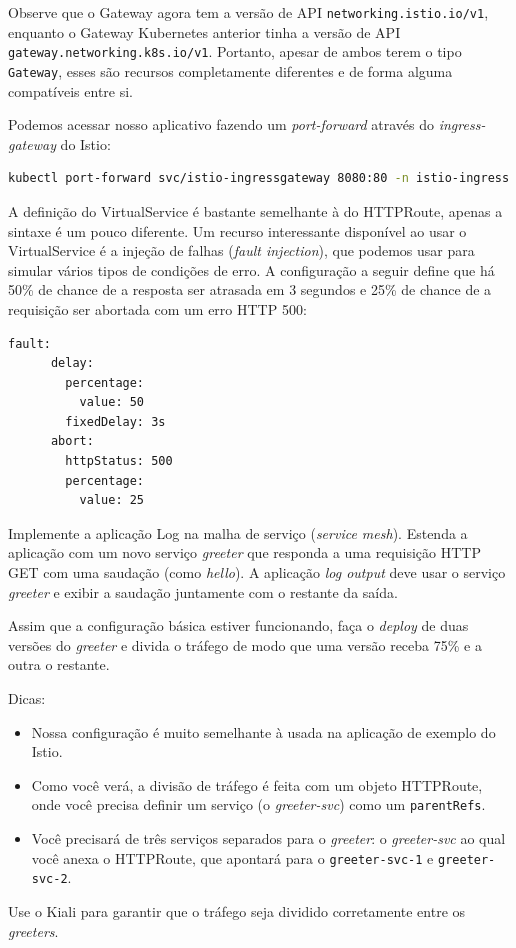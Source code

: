 \documentclass[11pt,a4paper]{article}
\begin{document}
Observe que o Gateway agora tem a versão de API \texttt{networking.istio.io/v1}, enquanto o Gateway Kubernetes anterior tinha a versão de API \texttt{gateway.networking.k8s.io/v1}. Portanto, apesar de ambos terem o tipo \texttt{Gateway}, esses são recursos completamente diferentes e de forma alguma compatíveis entre si.

Podemos acessar nosso aplicativo fazendo um \textit{port-forward} através do \textit{ingress-gateway} do Istio:

\begin{lstlisting}[language=bash]
kubectl port-forward svc/istio-ingressgateway 8080:80 -n istio-ingress
\end{lstlisting}

A definição do VirtualService é bastante semelhante à do HTTPRoute, apenas a sintaxe é um pouco diferente. Um recurso interessante disponível ao usar o VirtualService é a injeção de falhas (\textit{fault injection}), que podemos usar para simular vários tipos de condições de erro. A configuração a seguir define que há 50\% de chance de a resposta ser atrasada em 3 segundos e 25\% de chance de a requisição ser abortada com um erro HTTP 500:

\begin{lstlisting}[language=bash]
    fault:
      delay:
        percentage:
          value: 50
        fixedDelay: 3s
      abort:
        httpStatus: 500
        percentage:
          value: 25
\end{lstlisting}

\begin{tcolorbox}[colback=blue!5!white,colframe=blue!75!black,title=Exercício: 5.3. Log app, a Edição Service Mesh]
Implemente a aplicação Log na malha de serviço (\textit{service mesh}). Estenda a aplicação com um novo serviço \textit{greeter} que responda a uma requisição HTTP GET com uma saudação (como \textit{hello}). A aplicação \textit{log output} deve usar o serviço \textit{greeter} e exibir a saudação juntamente com o restante da saída.

Assim que a configuração básica estiver funcionando, faça o \textit{deploy} de duas versões do \textit{greeter} e divida o tráfego de modo que uma versão receba 75\% e a outra o restante.

Dicas:
\begin{itemize}
    \item Nossa configuração é muito semelhante à usada na aplicação de exemplo do Istio.
    \item Como você verá, a divisão de tráfego é feita com um objeto HTTPRoute, onde você precisa definir um serviço (o \textit{greeter-svc}) como um \texttt{parentRefs}.
    \item Você precisará de três serviços separados para o \textit{greeter}: o \textit{greeter-svc} ao qual você anexa o HTTPRoute, que apontará para o \texttt{greeter-svc-1} e \texttt{greeter-svc-2}.
\end{itemize}

Use o Kiali para garantir que o tráfego seja dividido corretamente entre os \textit{greeters}.
\end{tcolorbox}
\end{document}

